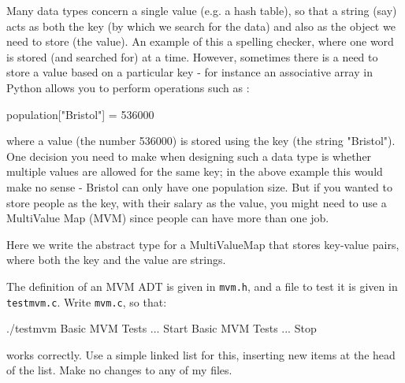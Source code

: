
Many data types concern a single value (e.g. a hash table), so that
a string (say) acts as both the key (by which we search for the data)
and also as the object we need to store (the value). An example of this a spelling checker,
where one word is stored (and searched for) at a time.  However, sometimes
there is a need to store a value based on a particular key - for instance
an associative array in Python allows you to perform operations such as :
\begin{codesnippet}
population["Bristol"] = 536000
\end{codesnippet}
where a value (the number 536000) is stored using the key (the string "Bristol").
One decision you need to make when designing such a data type is whether
multiple values are allowed for the same key; in the above example this
would make no sense - Bristol can only have one population size. But if
you wanted to store people as the key, with their salary as the value,
you might need to use a MultiValue Map (MVM) since people can have more than
one job.

Here we write the abstract type for a MultiValueMap that stores key-value pairs,
where both the key and the value are strings.

\begin{exercise}
\label{ex:mvm}
The definition of an MVM ADT is given in \verb^mvm.h^, and a file to test it is given
in \verb^testmvm.c^.  Write \verb^mvm.c^, so that:
{\small
\begin{terminaloutput}
./testmvm
Basic MVM Tests ... Start
Basic MVM Tests ... Stop
\end{terminaloutput}
}
\noindent works correctly. Use a simple linked list for this, inserting
new items at the head of the list.
Make no changes to any of my files.
\end{exercise}
